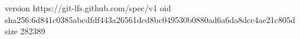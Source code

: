 version https://git-lfs.github.com/spec/v1
oid sha256:6d841c0385abcdfdf443a26561dcd8bc049530b0880ad6a6da8dcc4ae21c805d
size 282389
